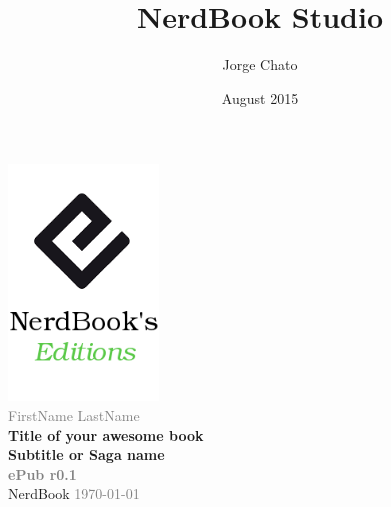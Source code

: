 \documentclass[ebook,12pt,oneside,openany]{memoir}
\author{Jorge Chato}
\title{NerdBook Studio}
\date{August 2015}
\begin{document}

\pagestyle{plain}
{\pagestyle{empty}
  \changepage{5cm}{1cm}{-0.5cm}{-0.5cm}{}{-2cm}{}{}{}
  \begin{center}
    \includegraphics[width=0.3\textwidth,natwidth=190,natheight=298]{../images/edition.png}\\[20cm]
    \textcolor{Gray}{\Large FirstName LastName}\\
    {\Huge \textbf{Title of your awesome book}}\\
    \textbf{Subtitle or Saga name}\\[15cm]
    {\small
      \textcolor{Gray}{\textbf{ePub r0.1}\\}
      NerdBook \textcolor{Gray}{\today}
    }
  \end{center}
  \clearpage
}
\tableofcontents
\end{document}

